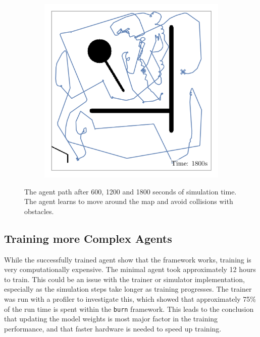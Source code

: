 \begin{figure}[H]
\begin{subfigure}[b]{\w}
    \end{subfigure}
    \begin{subfigure}[b]{\w}
        \centering
        \includegraphics[width=\textwidth]{./figures/rl/small-agent-(after-1800s).png}
    \end{subfigure}
    \caption{The agent path after 600, 1200 and 1800 seconds of simulation time. The agent learns to move around the map and avoid collisions with obstacles.}
    \label{fig:rl-minimal-path}
\end{figure}

\subsection{Training more Complex Agents}
While the successfully trained agent show that the framework works, training is very computationally expensive. The minimal agent took approximately 12 hours to train. This could be an issue with the trainer or simulator implementation, especially as the simulation steps take longer as training progresses. The trainer was run with a profiler to investigate this, which showed that approximately 75\% of the run time is spent within the \texttt{burn} framework. This leads to the conclusion that updating the model weights is most major factor in the training performance, and that faster hardware is needed to speed up training. \\

